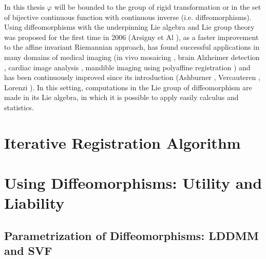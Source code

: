 In this thesis $\varphi$ will be bounded to the group of rigid transformation or in the set of bijective continuous function with continuous inverse (i.e. diffeomorphisms).
Using diffeomorphisms with the underpinning Lie algebra and Lie group theory was proposed for the first time in 2006 (Arsigny et Al \cite{Arsigny:MRM:06}), as a faster improvement to the affine invariant Riemannian approach, has found successful applications in many domains of medical imaging (in vivo mosaicing \cite{Vercauteren:PHD:08}, brain Alzheimer detection \cite{Lorenzi:PhD:12}, cardiac image analysis \cite{Mansi:IJCV:11}, mandible imaging using polyaffine registration \cite{Seiler:MICCAI:11}) and has been continuously improved since its introduction (Ashburner \cite{Ashburner:07}, Vercauteren \cite{VercauterenPPA08}, Lorenzi \cite{Lorenzi:pt:13}). In this setting, computations in the Lie group of diffeomorphism are made in its Lie algebra, in which it is possible to apply easily calculus and statistics.


\section{Iterative Registration Algorithm}



\section{Using Diffeomorphisms: Utility and Liability}




\subsection{Parametrization of Diffeomorphisms: LDDMM and SVF}




